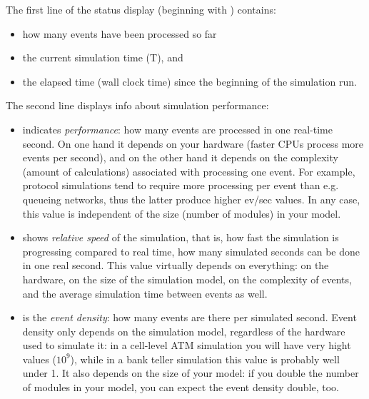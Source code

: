 
The first line of the status display (beginning with \ttt{**})
contains:

\begin{itemize}
   \item{how many events have been processed so far}
   \item{the current simulation time (T), and}
   \item{the elapsed time (wall clock time) since the beginning of the simulation run.}
\end{itemize}

The second line displays info about simulation performance:

\begin{itemize}
   \item{ indicates \textit{performance}: how many events are processed
     in one real-time second.  On one hand it depends on your hardware
     (faster CPUs process more events per second), and on the other hand
     it depends on the complexity (amount of calculations) associated
     with processing one event. For example, protocol simulations tend to require
     more processing per event than e.g. queueing networks, thus
     the latter produce higher ev/sec values.
     In any case, this value is independent of the size (number of modules) in your model.}
   \item{ shows \textit{relative speed} of the simulation, that is,
     how fast the simulation is progressing compared to real time, how many
     simulated seconds can be done in one real second. This value virtually depends
     on everything: on the hardware, on the size of the simulation model,
     on the complexity of events, and the average simulation time between events as well.}
   \item{ is the \textit{event density}: how many events are
     there per simulated second. Event density only depends on the simulation model,
     regardless of the hardware used to simulate it: in a cell-level ATM simulation
     you will have very hight values ($10^9$), while in a bank teller simulation
     this value is probably well under 1. It also depends on the size of your
     model: if you double the number of modules in your model, you can expect
     the event density double, too.}
\end{itemize}

